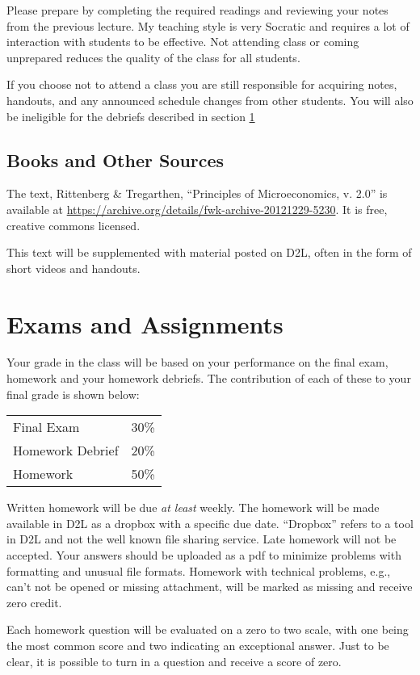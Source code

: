 \documentclass[letterpaper,10pt]{article}
\begin{document}
Please prepare by completing the required readings and reviewing your notes from the
previous lecture. My teaching style is very Socratic and requires a
lot of interaction with students to be effective. Not attending class
or coming unprepared reduces the quality of the class for all
students.

If you choose not to attend a class you are still responsible for
acquiring notes, handouts, and any announced schedule changes from
other students. You will also be ineligible for the debriefs described in section \ref{Grades}

\subsection{Books and Other Sources}
The text, Rittenberg \& Tregarthen, ``Principles of Microeconomics, v. 2.0'' is available at \url{https://archive.org/details/fwk-archive-20121229-5230}.  It is free, creative commons licensed.  

This text will be supplemented with material posted on D2L, often in the form of short videos and handouts.

\section{Exams and Assignments}\label{Grades}

Your grade in the class will be based on your performance on the final
exam, homework and your homework debriefs. The contribution of each of these to your final grade is shown below:

\begin{tabular}{ll}
  Final Exam&30\%\\
  Homework Debrief&20\%\\
  Homework&50\%\\
\end{tabular} 

Written homework will be due \emph{at least} weekly.  The homework will be made available in D2L as a dropbox with a specific due date. ``Dropbox'' refers to a tool in D2L and not the well known file sharing service. 
Late homework will not be accepted.  Your answers should be uploaded as a pdf to minimize problems with formatting and unusual file formats. Homework with technical problems, e.g., can't not be opened or missing attachment, will be marked as missing and receive zero credit.

Each homework question will be evaluated on a zero to two scale, with one being the most common score and two indicating an exceptional answer.  Just to be clear, it is possible to turn in a question and receive a score of zero.
\end{document}
